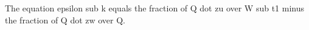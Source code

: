 The equation epsilon sub k equals the fraction of Q dot zu over W sub t1 minus the fraction of Q dot zw over Q.